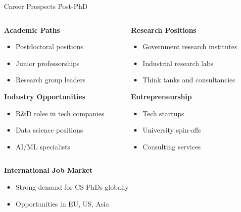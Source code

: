 \documentclass[aspectratio=169,10pt]{beamer}
\begin{document}
\begin{frame}{Career Prospects Post-PhD}
    \begin{columns}[T]
        \begin{column}{0.5\textwidth}
            \textbf{Academic Paths}
            \begin{itemize}
                \item Postdoctoral positions
                \item Junior professorships
                \item Research group leaders
            \end{itemize}
            
            \textbf{Industry Opportunities}
            \begin{itemize}
                \item R\&D roles in tech companies
                \item Data science positions
                \item AI/ML specialists
            \end{itemize}
        \end{column}
        \begin{column}{0.5\textwidth}
            \textbf{Research Positions}
            \begin{itemize}
                \item Government research institutes
                \item Industrial research labs
                \item Think tanks and consultancies
            \end{itemize}
            
            \textbf{Entrepreneurship}
            \begin{itemize}
                \item Tech startups
                \item University spin-offs
                \item Consulting services
            \end{itemize}
        \end{column}
    \end{columns}
    
    \textbf{International Job Market}
    \begin{itemize}
        \item Strong demand for CS PhDs globally
        \item Opportunities in EU, US, Asia
    \end{itemize}
\end{frame}
\end{document}
